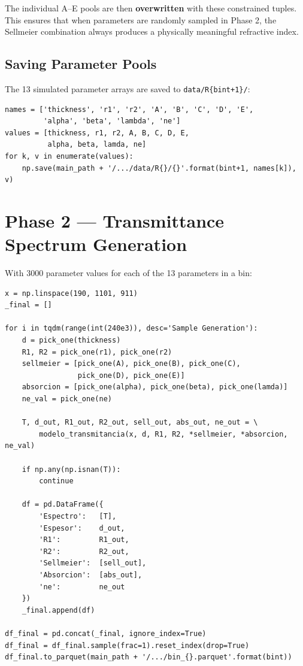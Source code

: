 \documentclass[11pt,a4paper]{article}
\begin{document}
The individual A--E pools are then \textbf{overwritten} with these constrained tuples. This ensures that when parameters are randomly sampled in Phase 2, the Sellmeier combination always produces a physically meaningful refractive index.

\subsection{Saving Parameter Pools}

The 13 simulated parameter arrays are saved to {\tt data/R\{bint+1\}/}:
\begin{lstlisting}
names = ['thickness', 'r1', 'r2', 'A', 'B', 'C', 'D', 'E',
         'alpha', 'beta', 'lambda', 'ne']
values = [thickness, r1, r2, A, B, C, D, E,
          alpha, beta, lamda, ne]
for k, v in enumerate(values):
    np.save(main_path + '/.../data/R{}/{}'.format(bint+1, names[k]), v)
\end{lstlisting}

\section{Phase 2 — Transmittance Spectrum Generation}

With 3000 parameter values for each of the 13 parameters in a bin:

\begin{lstlisting}
x = np.linspace(190, 1101, 911)
_final = []

for i in tqdm(range(int(240e3)), desc='Sample Generation'):
    d = pick_one(thickness)
    R1, R2 = pick_one(r1), pick_one(r2)
    sellmeier = [pick_one(A), pick_one(B), pick_one(C),
                 pick_one(D), pick_one(E)]
    absorcion = [pick_one(alpha), pick_one(beta), pick_one(lamda)]
    ne_val = pick_one(ne)

    T, d_out, R1_out, R2_out, sell_out, abs_out, ne_out = \
        modelo_transmitancia(x, d, R1, R2, *sellmeier, *absorcion, ne_val)

    if np.any(np.isnan(T)):
        continue

    df = pd.DataFrame({
        'Espectro':   [T],
        'Espesor':    d_out,
        'R1':         R1_out,
        'R2':         R2_out,
        'Sellmeier':  [sell_out],
        'Absorcion':  [abs_out],
        'ne':         ne_out
    })
    _final.append(df)

df_final = pd.concat(_final, ignore_index=True)
df_final = df_final.sample(frac=1).reset_index(drop=True)
df_final.to_parquet(main_path + '/.../bin_{}.parquet'.format(bint))
\end{lstlisting}
\end{document}
